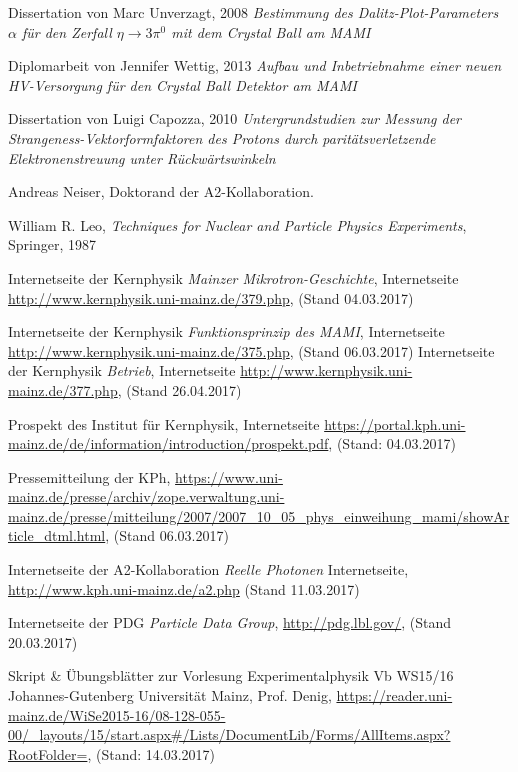 \documentclass[a4paper,11pt,oneside,final,german,openbib,pdftex]{scrbook}
\begin{document}
{\begin{appendix}
\begin{thebibliography}{99}
 Dissertation von Marc Unverzagt, 2008 {\em Bestimmung des Dalitz-Plot-Parameters $\alpha$ für den Zerfall $ \eta \rightarrow 3\pi^{0} $ mit dem Crystal Ball am MAMI}

 Diplomarbeit von Jennifer Wettig, 2013 {\em Aufbau und Inbetriebnahme einer neuen HV-Versorgung für den Crystal Ball Detektor am MAMI}

 Dissertation von Luigi Capozza, 2010 {\em Untergrundstudien zur Messung der
	Strangeness-Vektorformfaktoren
	des Protons durch parit\"atsverletzende
	Elektronenstreuung unter R\"uckw\"artswinkeln}

 Andreas Neiser, Doktorand der A2-Kollaboration.

 William R. Leo, \textit{Techniques for Nuclear and Particle Physics Experiments}, Springer, 1987


 Internetseite der Kernphysik {\em Mainzer Mikrotron-Geschichte}, Internetseite \url{http://www.kernphysik.uni-mainz.de/379.php}, (Stand 04.03.2017)

 Internetseite der Kernphysik {\em Funktionsprinzip des MAMI}, Internetseite \url{http://www.kernphysik.uni-mainz.de/375.php}, (Stand 06.03.2017)
 Internetseite der Kernphysik {\em Betrieb}, Internetseite \url{http://www.kernphysik.uni-mainz.de/377.php}, (Stand 26.04.2017)

 Prospekt des Institut für Kernphysik, Internetseite \url{https://portal.kph.uni-mainz.de/de/information/introduction/prospekt.pdf}, (Stand: 04.03.2017)

 Pressemitteilung der KPh, \url{https://www.uni-mainz.de/presse/archiv/zope.verwaltung.uni-mainz.de/presse/mitteilung/2007/2007_10_05_phys_einweihung_mami/showArticle_dtml.html}, (Stand 06.03.2017)

 Internetseite der A2-Kollaboration {\em Reelle Photonen}
Internetseite, \url{http://www.kph.uni-mainz.de/a2.php} (Stand 11.03.2017)

 Internetseite der PDG {\em Particle Data Group}, \url{http://pdg.lbl.gov/}, (Stand 20.03.2017)

 Skript \& Übungsblätter zur Vorlesung Experimentalphysik Vb WS15/16 Johannes-Gutenberg Universit\"at Mainz, Prof. Denig, \url{https://reader.uni-mainz.de/WiSe2015-16/08-128-055-00/_layouts/15/start.aspx#/Lists/DocumentLib/Forms/AllItems.aspx?RootFolder=}, (Stand: 14.03.2017)


\end{thebibliography}
\end{appendix}}
\end{document}
